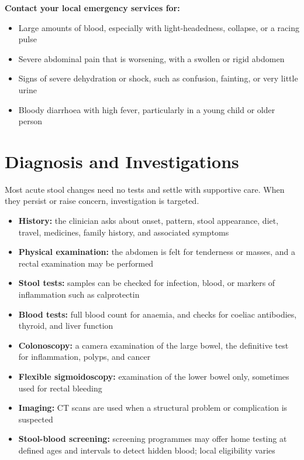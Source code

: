 \textbf{Contact your local emergency services for:}
\begin{itemize}
    \item Large amounts of blood, especially with light-headedness, collapse, or a racing pulse
    \item Severe abdominal pain that is worsening, with a swollen or rigid abdomen
    \item Signs of severe dehydration or shock, such as confusion, fainting, or very little urine
    \item Bloody diarrhoea with high fever, particularly in a young child or older person
\end{itemize}

\section*{Diagnosis and Investigations}
Most acute stool changes need no tests and settle with supportive care. When they persist or raise concern, investigation is targeted.

\begin{itemize}
    \item \textbf{History:} the clinician asks about onset, pattern, stool appearance, diet, travel, medicines, family history, and associated symptoms
    \item \textbf{Physical examination:} the abdomen is felt for tenderness or masses, and a rectal examination may be performed
    \item \textbf{Stool tests:} samples can be checked for infection, blood, or markers of inflammation such as calprotectin
    \item \textbf{Blood tests:} full blood count for anaemia, and checks for coeliac antibodies, thyroid, and liver function
    \item \textbf{Colonoscopy:} a camera examination of the large bowel, the definitive test for inflammation, polyps, and cancer
    \item \textbf{Flexible sigmoidoscopy:} examination of the lower bowel only, sometimes used for rectal bleeding
    \item \textbf{Imaging:} CT scans are used when a structural problem or complication is suspected
    \item \textbf{Stool-blood screening:} screening programmes may offer home testing at defined ages and intervals to detect hidden blood; local eligibility varies
\end{itemize}

